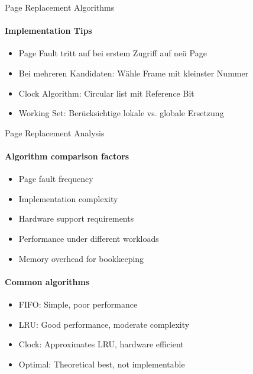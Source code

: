 \begin{concept}{Page Replacement Algorithms}
    \paragraph{Implementation Tips}
    \begin{itemize}
        \item Page Fault tritt auf bei erstem Zugriff auf neü Page
        \item Bei mehreren Kandidaten: Wähle Frame mit kleinster Nummer
        \item Clock Algorithm: Circular list mit Reference Bit
        \item Working Set: Berücksichtige lokale vs. globale Ersetzung
    \end{itemize}
\end{concept}

\begin{KR}{Page Replacement Analysis}
    \paragraph{Algorithm comparison factors}
    \begin{itemize}
        \item Page fault frequency
        \item Implementation complexity
        \item Hardware support requirements
        \item Performance under different workloads
        \item Memory overhead for bookkeeping
    \end{itemize}
    
    \paragraph{Common algorithms}
    \begin{itemize}
        \item FIFO: Simple, poor performance
        \item LRU: Good performance, moderate complexity
        \item Clock: Approximates LRU, hardware efficient
        \item Optimal: Theoretical best, not implementable
    \end{itemize}
\end{KR}

